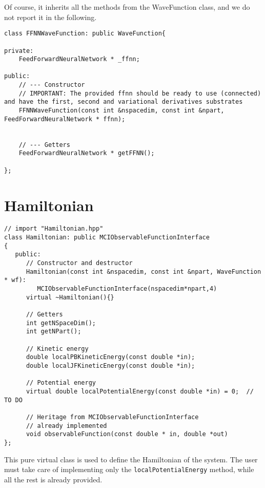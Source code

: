 \documentclass[11pt,a4paper,twoside]{article}
\begin{document}
Of course, it inherits all the methods from the WaveFunction class, and we do not report it in the following.

\begin{lstlisting}
class FFNNWaveFunction: public WaveFunction{

private:
    FeedForwardNeuralNetwork * _ffnn;

public:
    // --- Constructor
    // IMPORTANT: The provided ffnn should be ready to use (connected) and have the first, second and variational derivatives substrates
    FFNNWaveFunction(const int &nspacedim, const int &npart, FeedForwardNeuralNetwork * ffnn);


    // --- Getters
    FeedForwardNeuralNetwork * getFFNN();

};
\end{lstlisting}









\section{Hamiltonian} %
\label{sec:hamiltonian}

\begin{lstlisting}
// import "Hamiltonian.hpp"
class Hamiltonian: public MCIObservableFunctionInterface
{
   public:
      // Constructor and destructor
      Hamiltonian(const int &nspacedim, const int &npart, WaveFunction * wf):
         MCIObservableFunctionInterface(nspacedim*npart,4)
      virtual ~Hamiltonian(){}

      // Getters
      int getNSpaceDim();
      int getNPart();

      // Kinetic energy
      double localPBKineticEnergy(const double *in);
      double localJFKineticEnergy(const double *in);

      // Potential energy
      virtual double localPotentialEnergy(const double *in) = 0;  // TO DO

      // Heritage from MCIObservableFunctionInterface
      // already implemented
      void observableFunction(const double * in, double *out)
};
\end{lstlisting}

This pure virtual class is used to define the Hamiltonian of the system.
The user must take care of implementing only the \verb+localPotentialEnergy+ method, while all the rest is already provided.
\end{document}
